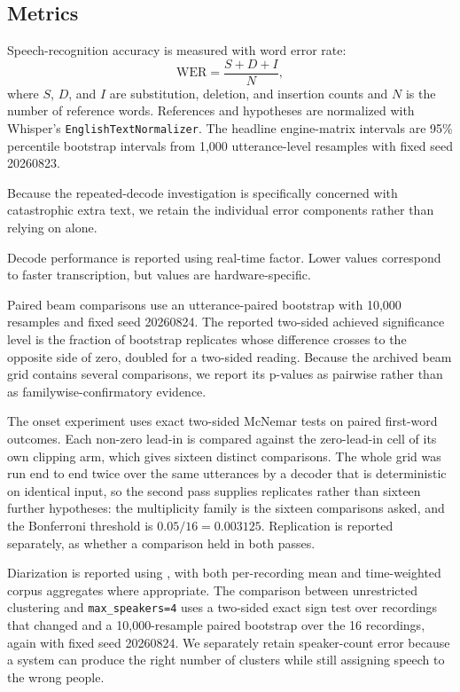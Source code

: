\subsection{Metrics}

Speech-recognition accuracy is measured with word error rate:
\begin{equation}
  \mathrm{WER} = \frac{S + D + I}{N},
\end{equation}
where $S$, $D$, and $I$ are substitution, deletion, and insertion counts and $N$ is the number
of reference words. References and hypotheses are normalized with Whisper's
\texttt{EnglishTextNormalizer}. The headline engine-matrix intervals are 95\% percentile
bootstrap intervals from 1,000 utterance-level resamples with fixed seed 20260823.

Because the repeated-decode investigation is specifically concerned with catastrophic extra text,
we retain the individual error components rather than relying on \wer{} alone.

Decode performance is reported using real-time factor. Lower values correspond to faster
transcription, but \rtf{} values are hardware-specific.

Paired beam comparisons use an utterance-paired bootstrap with 10,000 resamples and fixed seed
20260824. The reported two-sided achieved significance level is the fraction of bootstrap
replicates whose difference crosses to the opposite side of zero, doubled for a two-sided reading.
Because the archived beam grid contains several comparisons, we report its p-values as pairwise
rather than as familywise-confirmatory evidence.

The onset experiment uses exact two-sided McNemar tests on paired first-word outcomes. Each
non-zero lead-in is compared against the zero-lead-in cell of its own clipping arm, which gives
sixteen distinct comparisons. The whole grid was run end to end twice over the same utterances
by a decoder that is deterministic on identical input, so the second pass supplies replicates
rather than sixteen further hypotheses: the multiplicity family is the sixteen comparisons
asked, and the Bonferroni threshold is $0.05/16 = 0.003125$. Replication is reported separately,
as whether a comparison held in both passes.

Diarization is reported using \der{}, with both per-recording mean and time-weighted corpus
aggregates where appropriate. The comparison between unrestricted clustering and
\texttt{max\_speakers=4} uses a two-sided exact sign test over recordings that changed and a
10,000-resample paired bootstrap over the 16 recordings, again with fixed seed 20260824. We separately retain speaker-count error because a system can
produce the right number of clusters while still assigning speech to the wrong people.

